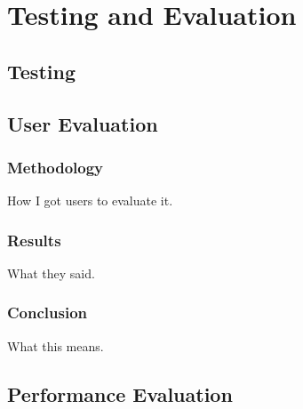 \documentclass[../dissertation.tex]{subfiles}
\begin{document}
\chapter{Testing and Evaluation}

\section{Testing}



\section{User Evaluation}

\subsection{Methodology}

How I got users to evaluate it.

\subsection{Results}

What they said.

\subsection{Conclusion}

What this means.

\section{Performance Evaluation}
\end{document}
